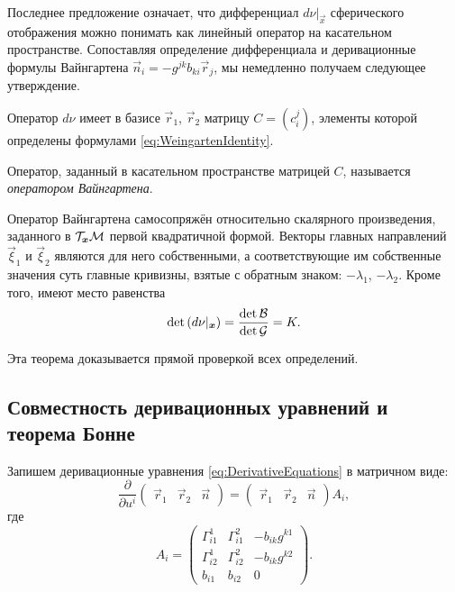 Последнее предложение означает, что дифференциал $d\nu|_{\vec{x}}$ сферического отображения можно понимать как линейный оператор на касательном пространстве. Сопоставляя определение дифференциала и деривационные формулы Вайнгартена $\vec{n}_i = -g^{jk}b_{ki}\vec{r}_j$, мы немедленно получаем следующее утверждение.

\begin{proposition}
	Оператор $d\nu$ имеет в базисе $\vec{r}_1$, $\vec{r}_2$ матрицу $C = (c^j_i)$, элементы которой определены формулами \eqref{eq:WeingartenIdentity}.
\end{proposition}

\begin{definition}
	Оператор, заданный в касательном пространстве матрицей $C$, называется \textit{оператором Вайнгартена}.
\end{definition}

\begin{theorem} \label{theorem:Weingarten}
	Оператор Вайнгартена самосопряжён относительно скалярного произведения, заданного в $\mathcal{T}_{\boldsymbol{x}}\mathcal{M}$ первой квадратичной формой. Векторы главных направлений $\vec{\xi}_1$ и $\vec{\xi}_2$ являются для него собственными, а соответствующие им собственные значения суть главные кривизны, взятые с обратным знаком: $-\lambda_1$, $-\lambda_2$. Кроме того, имеют место равенства
	\[
		\det\left(d\nu|_{\boldsymbol{x}}\right) = \frac{\det\mathcal{B}}{\det\mathcal{G}} = K.
	\]
\end{theorem}

\noindent
Эта теорема доказывается прямой проверкой всех определений.

\subsection{Совместность деривационных уравнений и теорема Бонне}

Запишем деривационные уравнения \eqref{eq:DerivativeEquations} в матричном виде:
\[
	\frac{\partial}{\partial u^i}
	\begin{pmatrix}
		\vec{r}_1 & \vec{r}_2 & \vec{n}
	\end{pmatrix} =
	\begin{pmatrix}
		\vec{r}_1 & \vec{r}_2 & \vec{n}
	\end{pmatrix}A_i,
\]
где
\[
	A_i =
	\begin{pmatrix}
		\Gamma_{i1}^1 & \Gamma_{i1}^2 & -b_{ik}g^{k1}\\
		\Gamma_{i2}^1 & \Gamma_{i2}^2 & -b_{ik}g^{k2}\\
		b_{i1} & b_{i2} & 0
	\end{pmatrix}.
\]

